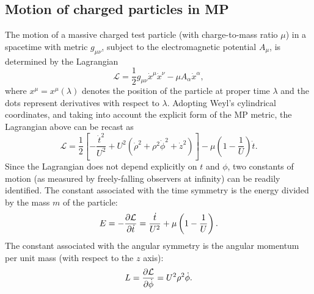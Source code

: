 \subsection{Motion of charged particles in \ac{MP}}
\label{sec:motion}

The motion of a massive charged test particle (with charge-to-mass ratio $\mu$) in a spacetime with metric $g_{\mu \nu}$, subject to the electromagnetic potential $A_{\mu}$, is determined by the Lagrangian
\begin{equation}
  \mathcal{L} = \frac{1}{2}g_{\mu \nu}\dot{x}^\mu \dot{x}^\nu - \mu A_{\alpha}\dot{x}^\alpha,
  \label{eq:lagrangian_for_charged_particle}
\end{equation}
where $x^{\mu} = x^{\mu}(\lambda)$ denotes the position of the particle at proper time $\lambda$ and the dots represent derivatives with respect to $\lambda$. Adopting Weyl's cylindrical coordinates, and taking into account the explicit form of the \ac{MP} metric, the Lagrangian above can be recast as~\cite{RYZNER2015}
%
\begin{equation}
  \mathcal{L} = \frac{1}{2}\left[-\frac{\dot{t}^2}{U^2} + U^2\left( \dot{\rho}^2 + \rho^2\dot{\phi}^2 + \dot{z}^2 \right) \right] - \mu\left(1-\frac{1}{U}\right)\dot{t}.
  \label{eq:explicit_lagrangian_for_charged_particle}
\end{equation}
%
Since the Lagrangian does not depend explicitly on $t$ and $\phi$, two constants of motion (as measured by freely-falling observers at infinity) can be readily identified. The constant associated with the time symmetry is the energy divided by the mass $m$ of the particle:
%
\begin{equation}
  E = -\frac{\partial \mathcal{L}}{\partial \dot{t}} = \frac{\dot{t}}{U^2} + \mu\left(1-\frac{1}{U}\right).
  \label{eq:conserved_energy}
\end{equation}
%
The constant associated with the angular symmetry is the angular momentum per unit mass (with respect to the $z$ axis):
%
\begin{equation}
  L = \frac{\partial \mathcal{L}}{\partial \dot{\phi}} = U^2 \rho^2 \dot{\phi}.
  \label{eq:conserved_momentum}
\end{equation}

